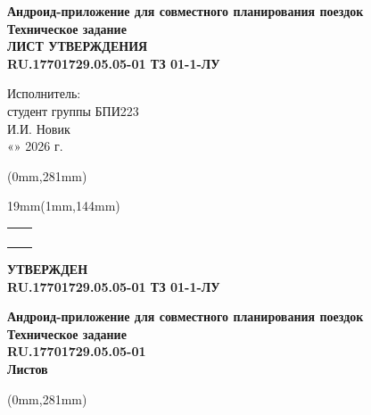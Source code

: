\documentclass[12pt,a4paper]{article}
\newcommand{\doccodebase}{RU.17701729.05.05-01}
\newcommand{\doccodeapproval}{RU.17701729.05.05-01 ТЗ 01-1-ЛУ}
\newcommand{\doctitle}{Андроид-приложение для совместного планирования поездок}
\newcommand{\leftapprovalstamp}[1]{%
  \begingroup
  \renewcommand{\arraystretch}{1.0}
  \setlength{\tabcolsep}{0pt}
  \footnotesize
  \begin{tabular}{|>{\centering\arraybackslash}m{0.65cm}|>{\centering\arraybackslash}m{1.05cm}|}
    \hline
    \rotatebox{90}{Подп. и дата} & \rule{0pt}{1.10cm}\\
    \hline
    \rotatebox{90}{Инв. № дубл.} & \rule{0pt}{1.00cm}\\
    \hline
    \rotatebox{90}{Взам. инв. №} & \rule{0pt}{1.00cm}\\
    \hline
    \rotatebox{90}{Подп. и дата} & \rule{0pt}{1.10cm}\\
    \hline
    \rotatebox{90}{Инв. № подл.} &
    \rotatebox{90}{\scalebox{0.70}{#1}}\rule{0pt}{0.95cm}\\
    \hline
  \end{tabular}
  \endgroup
}
\newcommand{\placestamp}[2]{%
  \begin{textblock*}{19mm}(1mm,#2)
    \leftapprovalstamp{#1}
  \end{textblock*}
}
\begin{document}
\vspace{0.75cm}
\begin{center}
  {\large\textbf{\doctitle}}\\[0.22cm]
  {\large\textbf{Техническое задание}}\\[0.18cm]
  {\large\textbf{ЛИСТ УТВЕРЖДЕНИЯ}}\\[0.18cm]
  {\large\textbf{\doccodeapproval}}
\end{center}

\vspace{1.15cm}
\begin{flushright}
  Исполнитель:\\[0.25cm]
  студент группы БПИ223\\[0.35cm]
  \underline{\hspace{2.5cm}} И.И. Новик\\[0.25cm]
  «\underline{\hspace{0.9cm}}» \underline{\hspace{2.8cm}} 2026 г.
\end{flushright}

\begin{textblock*}{\paperwidth}(0mm,281mm)
\end{textblock*}
\newpage

\thispagestyle{empty}
\placestamp{RU.17701729.05.05-01 ТЗ 01-1-ЛУ}{144mm}

\vspace*{-0.6cm}
\begin{flushleft}
  \textbf{УТВЕРЖДЕН}\\[0.2cm]
  \textbf{\doccodeapproval}
\end{flushleft}

\vspace{1.4cm}
\begin{center}
  {\large\textbf{\doctitle}}\\[0.22cm]
  {\Large\textbf{Техническое задание}}\\[0.22cm]
  {\Large\textbf{\doccodebase}}\\[0.2cm]
  {\Large\textbf{Листов \pageref{lastnumberedpage}}}
\end{center}

\begin{textblock*}{\paperwidth}(0mm,281mm)
\end{textblock*}

\clearpage
\hypersetup{pageanchor=true}
\setcounter{page}{2}
\pagestyle{tzstyle}
\tableofcontents
\clearpage
\end{document}
